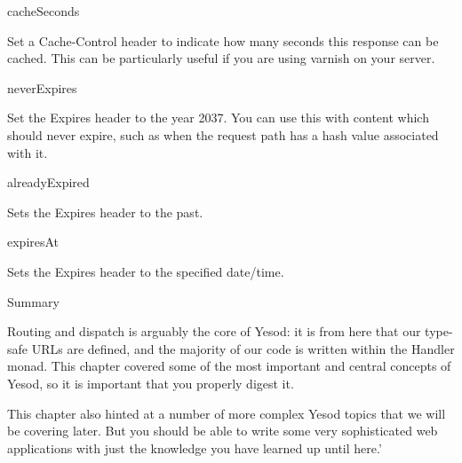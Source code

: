 cacheSeconds

Set a Cache-Control header to indicate how many seconds this response
can be cached. This can be particularly useful if you are using
varnish on your server.

neverExpires

Set the Expires header to the year 2037. You can use this with content
which should never expire, such as when the request path has a hash
value associated with it.

alreadyExpired

Sets the Expires header to the past.

expiresAt

Sets the Expires header to the specified date/time.

Summary

Routing and dispatch is arguably the core of Yesod: it is from here
that our type-safe URLs are defined, and the majority of our code is
written within the Handler monad. This chapter covered some of the
most important and central concepts of Yesod, so it is important that
you properly digest it.

This chapter also hinted at a number of more complex Yesod topics that
we will be covering later. But you should be able to write some very
sophisticated web applications with just the knowledge you have
learned up until here.'
